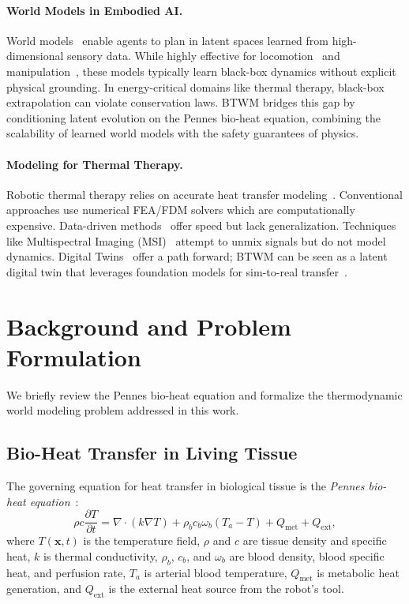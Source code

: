 \documentclass{article}
\begin{document}
\paragraph{World Models in Embodied AI.}
World models~\cite{hafner2023mastering,wu2023daydreamer} enable agents to plan in latent spaces learned from high-dimensional sensory data. While highly effective for locomotion~\cite{team2024humanoid} and manipulation~\cite{chen2025tactile}, these models typically learn black-box dynamics without explicit physical grounding. In energy-critical domains like thermal therapy, black-box extrapolation can violate conservation laws. BTWM bridges this gap by conditioning latent evolution on the Pennes bio-heat equation, combining the scalability of learned world models with the safety guarantees of physics.

\paragraph{Modeling for Thermal Therapy.}
Robotic thermal therapy relies on accurate heat transfer modeling~\cite{he2025moxibustion}. Conventional approaches use numerical FEA/FDM solvers which are computationally expensive. Data-driven methods~\cite{liu2024thermal,lahiri2023infrared} offer speed but lack generalization. Techniques like Multispectral Imaging (MSI)~\cite{zhang2025invisible} attempt to unmix signals but do not model dynamics. Digital Twins~\cite{qian2024digital,kumar2023real2sim} offer a path forward; BTWM can be seen as a latent digital twin that leverages foundation models for sim-to-real transfer~\cite{yang2024unifying}.


\section{Background and Problem Formulation}
\label{sec:background}

We briefly review the Pennes bio-heat equation and formalize the thermodynamic world modeling problem addressed in this work.

\subsection{Bio-Heat Transfer in Living Tissue}

The governing equation for heat transfer in biological tissue is the \emph{Pennes bio-heat equation}~\cite{pennes1948analysis}:
\begin{equation}
\label{eq:pennes}
\rho c \frac{\partial T}{\partial t}
=
\nabla \cdot \left(k \nabla T\right)
+
\rho_b c_b \omega_b (T_a - T)
+
Q_{\mathrm{met}}
+
Q_{\mathrm{ext}},
\end{equation}
where $T(\mathbf{x}, t)$ is the temperature field, $\rho$ and $c$ are tissue density and specific heat, $k$ is thermal conductivity, $\rho_b$, $c_b$, and $\omega_b$ are blood density, blood specific heat, and perfusion rate, $T_a$ is arterial blood temperature, $Q_{\mathrm{met}}$ is metabolic heat generation, and $Q_{\mathrm{ext}}$ is the external heat source from the robot's tool.
\end{document}
